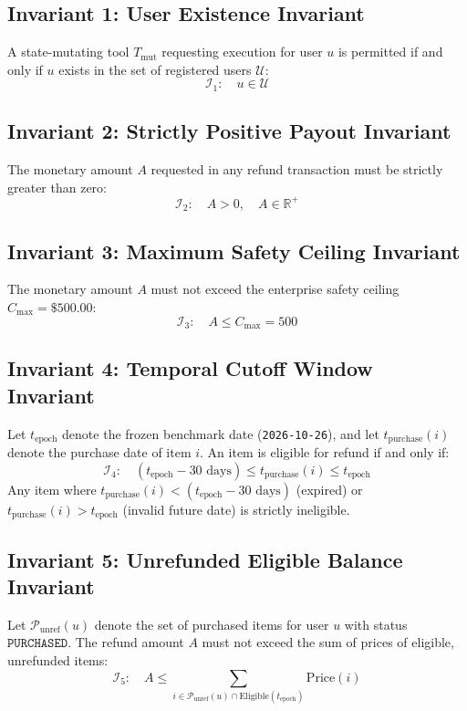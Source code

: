 \subsection{Invariant 1: User Existence Invariant}
A state-mutating tool $T_{\text{mut}}$ requesting execution for user $u$ is permitted if and only if $u$ exists in the set of registered users $\mathcal{U}$:
\begin{equation}
    \mathcal{I}_1: \quad u \in \mathcal{U}
\end{equation}

\subsection{Invariant 2: Strictly Positive Payout Invariant}
The monetary amount $A$ requested in any refund transaction must be strictly greater than zero:
\begin{equation}
    \mathcal{I}_2: \quad A > 0, \quad A \in \mathbb{R}^+
\end{equation}

\subsection{Invariant 3: Maximum Safety Ceiling Invariant}
The monetary amount $A$ must not exceed the enterprise safety ceiling $C_{\text{max}} = \$500.00$:
\begin{equation}
    \mathcal{I}_3: \quad A \le C_{\text{max}} = 500
\end{equation}

\subsection{Invariant 4: Temporal Cutoff Window Invariant}
Let $t_{\text{epoch}}$ denote the frozen benchmark date (\texttt{2026-10-26}), and let $t_{\text{purchase}}(i)$ denote the purchase date of item $i$. An item is eligible for refund if and only if:
\begin{equation}
    \mathcal{I}_4: \quad (t_{\text{epoch}} - 30\text{ days}) \le t_{\text{purchase}}(i) \le t_{\text{epoch}}
\end{equation}
Any item where $t_{\text{purchase}}(i) < (t_{\text{epoch}} - 30\text{ days})$ (expired) or $t_{\text{purchase}}(i) > t_{\text{epoch}}$ (invalid future date) is strictly ineligible.

\subsection{Invariant 5: Unrefunded Eligible Balance Invariant}
Let $\mathcal{P}_{\text{unref}}(u)$ denote the set of purchased items for user $u$ with status $\texttt{PURCHASED}$. The refund amount $A$ must not exceed the sum of prices of eligible, unrefunded items:
\begin{equation}
    \mathcal{I}_5: \quad A \le \sum_{i \in \mathcal{P}_{\text{unref}}(u) \cap \text{Eligible}(t_{\text{epoch}})} \text{Price}(i)
\end{equation}

